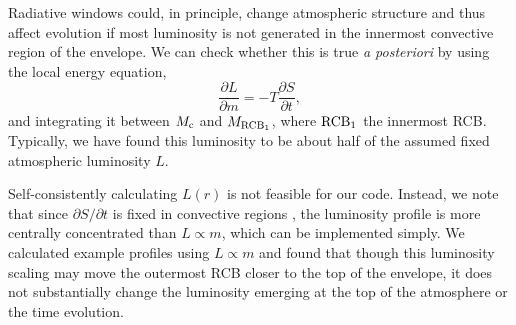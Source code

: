 \documentclass[apj]{emulateapj}
\newcommand{\co}{_{\rm c}}
\begin{document}
Radiative windows could, in principle, change atmospheric structure and thus affect evolution if most luminosity is not generated in the innermost convective region of the envelope.  We can check whether this is true \textit{a posteriori} by using the local energy equation,
\begin{equation}
\label{eq:localen}
\frac{\partial L}{\partial m}=-T \frac{\partial S}{\partial t},
\end{equation}
and integrating it between $M\co$ and $M_{\rm{RCB_1}}$, where $\rm{RCB_1}$ the innermost RCB. Typically, we have found this luminosity to be about half of the assumed fixed atmospheric luminosity $L$.

Self-consistently calculating $L(r)$ is not feasible for our code. Instead, we note that since  $\partial S/\partial t$ is fixed in convective regions \citep{arras06}, the luminosity profile is more centrally concentrated than $L \propto m$, which can be implemented simply.  We calculated example profiles using $L \propto m$ and found that though this luminosity scaling may move the outermost RCB closer to the top of the envelope, it does not substantially change the luminosity emerging at the top of the atmosphere or the time evolution. %

\end{document}
